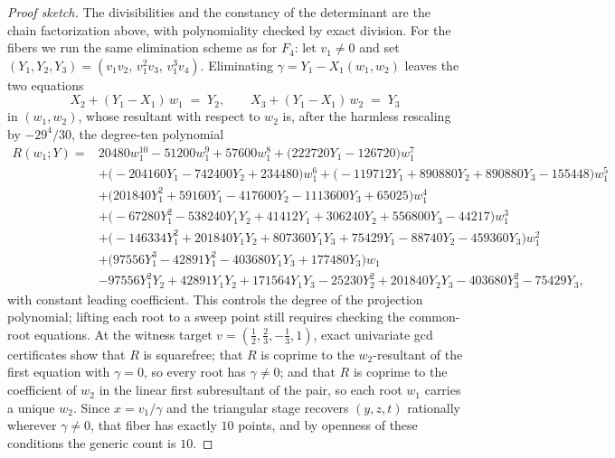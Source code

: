 \documentclass[11pt]{article}
\numberwithin{equation}{section}
\theoremstyle{plain}
\theoremstyle{definition}
\theoremstyle{remark}
\begin{document}
\begin{proof}[Proof sketch]
The divisibilities and the constancy of the determinant are the chain
factorization above, with polynomiality checked by exact division.
For the fibers we run the same elimination scheme as for $F_4$: let
$v_1\neq0$ and set $(Y_1,Y_2,Y_3)=(v_1v_2,\,v_1^2v_3,\,v_1^3v_4)$. Eliminating
$\gamma=Y_1-X_1(w_1,w_2)$ leaves the two equations
\[
X_2+(Y_1-X_1)\,w_1\;=\;Y_2,\qquad X_3+(Y_1-X_1)\,w_2\;=\;Y_3
\]
in $(w_1,w_2)$, whose resultant with respect to $w_2$ is, after the harmless
rescaling by $-29^4/30$, the degree-ten polynomial
{\small
\begin{align*}
R(w_1;Y)={}&20480w_1^{10}-51200w_1^{9}+57600w_1^{8}+\bigl(222720Y_1-126720\bigr)w_1^{7}\\
&+\bigl(-204160Y_1-742400Y_2+234480\bigr)w_1^{6}
+\bigl(-119712Y_1+890880Y_2+890880Y_3-155448\bigr)w_1^{5}\\
&+\bigl(201840Y_1^2+59160Y_1-417600Y_2-1113600Y_3+65025\bigr)w_1^{4}\\
&+\bigl(-67280Y_1^2-538240Y_1Y_2+41412Y_1+306240Y_2+556800Y_3-44217\bigr)w_1^{3}\\
&+\bigl(-146334Y_1^2+201840Y_1Y_2+807360Y_1Y_3+75429Y_1-88740Y_2-459360Y_3\bigr)w_1^{2}\\
&+\bigl(97556Y_1^3-42891Y_1^2-403680Y_1Y_3+177480Y_3\bigr)w_1\\
&-97556Y_1^2Y_2+42891Y_1Y_2+171564Y_1Y_3-25230Y_2^2+201840Y_2Y_3-403680Y_3^2-75429Y_3 ,
\end{align*}
}
with constant leading coefficient. This controls the degree of the
projection polynomial; lifting each root to a sweep point still requires
checking the common-root equations. At
the witness target
$v=(\tfrac12,\tfrac23,-\tfrac13,1)$, exact univariate gcd certificates show
that $R$ is squarefree; that $R$ is coprime to the $w_2$-resultant of the
first equation with $\gamma=0$, so every root has $\gamma\neq0$; and that $R$
is coprime to the coefficient of $w_2$ in the linear first subresultant
of the pair, so each root $w_1$ carries a unique $w_2$. Since $x=v_1/\gamma$ and the triangular stage recovers $(y,z,t)$
rationally wherever $\gamma\neq0$, that fiber has exactly $10$ points, and by
openness of these conditions the generic count is $10$. 
\end{proof}
\end{document}
